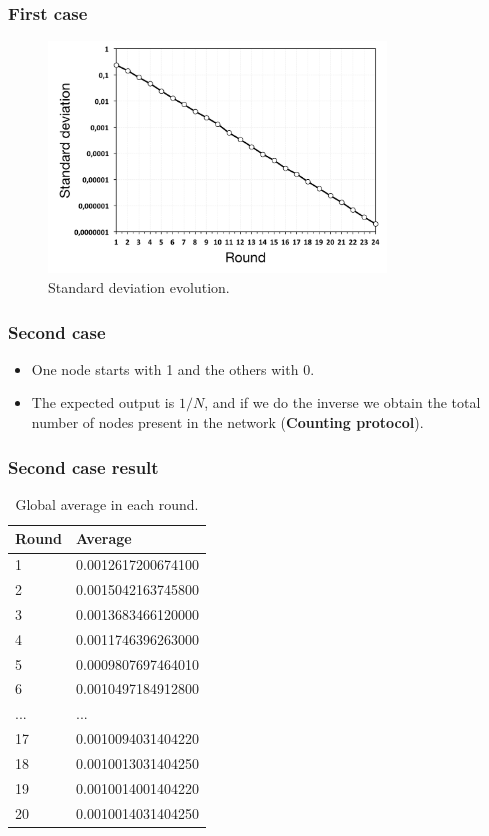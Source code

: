 \documentclass{beamer}
\begin{document}
\begin{frame}
\frametitle{First case}
    
\begin{figure}[p]
\centering
\includegraphics[keepaspectratio=true, width=0.8\textwidth]{images/aggregation_standard_deviation}
\caption{Standard deviation evolution.}
\label{fig:aggregation_standard_deviation}
\end{figure}

\end{frame}

\begin{frame}
\frametitle{Second case}

\begin{itemize}
  \item One node starts with 1 and the others with 0.
  \item The expected output is $1/N$, and if we do the inverse we obtain the total number of nodes present in the network (\textbf{Counting protocol}).
\end{itemize}
\end{frame}

\begin{frame}
\frametitle{Second case result}
\begin{table}
\begin{tabular}{l l}
\toprule
\textbf{Round} & \textbf{Average}\\
\midrule
1 & 0.0012617200674100 \\
2 & 0.0015042163745800 \\
3 & 0.0013683466120000 \\
4 & 0.0011746396263000 \\
5 & 0.0009807697464010 \\
6 & 0.0010497184912800 \\
... & ... \\
17  & 0.0010094031404220 \\
18  & 0.0010013031404250 \\
19  & 0.0010014001404220 \\
20  & 0.0010014031404250 \\
\bottomrule
\end{tabular}
\caption{Global average in each round.}
\end{table}
\end{frame}
\end{document}
